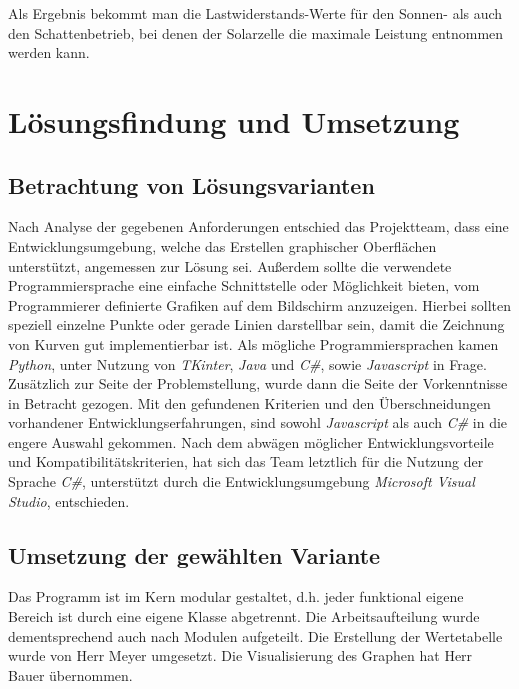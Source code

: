 \documentclass[a4paper]{article}
\begin{document}
    Als Ergebnis bekommt man die Lastwiderstands-Werte für den Sonnen- als auch den Schattenbetrieb, bei denen der Solarzelle die maximale Leistung entnommen werden kann.

\newpage
\section{Lösungsfindung und Umsetzung}

\subsection{Betrachtung von Lösungsvarianten}

    Nach Analyse der gegebenen Anforderungen entschied das Projektteam, dass eine Entwicklungsumgebung, welche das Erstellen graphischer Oberflächen unterstützt, angemessen zur Lösung sei.
    Außerdem sollte die verwendete Programmiersprache eine einfache Schnittstelle oder Möglichkeit bieten, vom Programmierer definierte Grafiken auf dem Bildschirm anzuzeigen.
    Hierbei sollten speziell einzelne Punkte oder gerade Linien darstellbar sein, damit die Zeichnung von Kurven gut implementierbar ist.
    Als mögliche Programmiersprachen kamen \textit{\glqq Python\grqq{}}, unter Nutzung von \textit{\glqq TKinter\grqq{}}, \textit{\glqq Java\grqq{}} und \textit{\glqq C\#\grqq{}}, sowie \textit{\glqq Javascript\grqq{}} in Frage.
    Zusätzlich zur Seite der Problemstellung, wurde dann die Seite der Vorkenntnisse in Betracht gezogen.
    Mit den gefundenen Kriterien und den Überschneidungen vorhandener Entwicklungserfahrungen, sind sowohl \textit{\glqq Javascript\grqq{}} als auch \textit{\glqq C\#\grqq{}} in die engere Auswahl gekommen.
    Nach dem abwägen möglicher Entwicklungsvorteile und Kompatibilitätskriterien, hat sich das Team letztlich für die Nutzung der Sprache \textit{\glqq C\#\grqq{}}, unterstützt durch die Entwicklungsumgebung \textit{\glqq Microsoft Visual Studio\grqq{}}, entschieden.

\subsection{Umsetzung der gewählten Variante}

    Das Programm ist im Kern modular gestaltet, d.h. jeder funktional eigene Bereich ist durch eine eigene Klasse abgetrennt.
    Die Arbeitsaufteilung wurde dementsprechend auch nach Modulen aufgeteilt.
    Die Erstellung der Wertetabelle wurde von Herr Meyer umgesetzt.
    Die Visualisierung des Graphen hat Herr Bauer übernommen.
\end{document}
